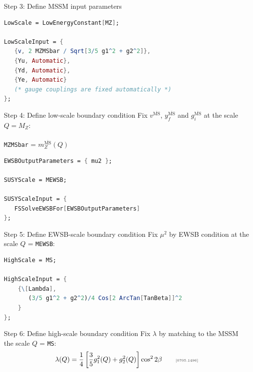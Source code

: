 \documentclass[hyperref={pdfpagelabels=false},ngerman]{beamer}
\newcommand{\mycite}[1]{\ensuremath{\text{\textcolor{darkgray}{\tiny [#1]}}}}
\newcommand{\MSbar}{\ensuremath{\overline{\text{MS}}}}
\begin{document}
\begin{frame}{Step 3: Define MSSM input parameters}
  \usebox{\listbox}
\end{frame}

\begin{lrbox}{\listbox}\begin{lstlisting}[language=Mathematica]
LowScale = LowEnergyConstant[MZ];

LowScaleInput = {
   {v, 2 MZMSbar / Sqrt[3/5 g1^2 + g2^2]},
   {Yu, Automatic},
   {Yd, Automatic},
   {Ye, Automatic}
   (* gauge couplings are fixed automatically *)
};
\end{lstlisting}\end{lrbox}

\begin{frame}{Step 4: Define low-scale boundary condition}
  Fix $v^{\MSbar}$, $y_f^{\MSbar}$ and $g_i^{\MSbar}$ at the scale $Q = M_Z$:\\[2em]
  \usebox{\listbox}
  \\[1em]
  \lstinline{MZMSbar} = $m_Z^{\MSbar}(Q)$
\end{frame}

\begin{lrbox}{\listbox}\begin{lstlisting}[language=Mathematica]
EWSBOutputParameters = { mu2 };

SUSYScale = MEWSB;

SUSYScaleInput = {
   FSSolveEWSBFor[EWSBOutputParameters]
};
\end{lstlisting}\end{lrbox}

\begin{frame}{Step 5: Define EWSB-scale boundary condition}
  Fix $\mu^2$ by EWSB condition at the scale $Q$ = \lstinline{MEWSB}:\\[2em]
  \usebox{\listbox}
\end{frame}

\begin{lrbox}{\listbox}\begin{lstlisting}[language=Mathematica]
HighScale = MS;

HighScaleInput = {
    {\[Lambda],
       (3/5 g1^2 + g2^2)/4 Cos[2 ArcTan[TanBeta]]^2
    }
};
\end{lstlisting}\end{lrbox}

\begin{frame}{Step 6: Define high-scale boundary condition}
  Fix $\lambda$ by matching to the MSSM the scale $Q$ = \lstinline{MS}:
  \begin{align*}
    \lambda(Q) = \frac{1}{4} \left[ \frac{3}{5} g_1^2(Q) + g_2^2(Q) \right] \cos^2 {2\beta}
    \qquad \text{\mycite{0705.1496}}
  \end{align*}
  \\[1em]
  \usebox{\listbox}
\end{frame}
\end{document}
